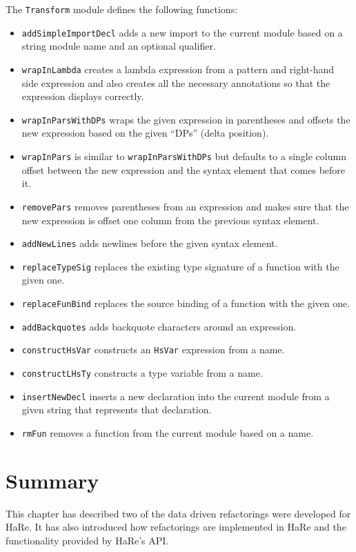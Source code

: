 The \texttt{Transform} module defines the following functions:

\begin{itemize}
\item \texttt{addSimpleImportDecl} adds a new import to the current module based on a string module name and an optional qualifier.
\item \texttt{wrapInLambda} creates a lambda expression from a pattern and right-hand side expression and also creates all the necessary annotations so that the expression displays correctly.
\item \texttt{wrapInParsWithDPs} wraps the given expression in parentheses and offsets the new expression based on the given ``DPs'' (delta position).
\item \texttt{wrapInPars} is similar to \texttt{wrapInParsWithDPs} but defaults to a single column offset between the new expression and the syntax element that comes before it.
\item  \texttt{removePars} removes parentheses from an expression and makes sure that the new expression is offset one column from the previous syntax element.
\item \texttt{addNewLines} adds newlines before the given syntax element.
\item \texttt{replaceTypeSig} replaces the existing type signature of a function with the given one.
\item \texttt{replaceFunBind} replaces the source binding of a function with the given one.
\item \texttt{addBackquotes} adds backquote characters around an expression.
\item \texttt{constructHsVar} constructs an \texttt{HsVar} expression from a name.
\item \texttt{constructLHsTy} constructs a type variable from a name.
\item \texttt{insertNewDecl} inserts a new declaration into the current module from a given string that represents that declaration.
\item \texttt{rmFun} removes a function from the current module based on a name.
\end{itemize}


\section{Summary}

This chapter has described two of the data driven refactorings were developed for HaRe. It has also introduced how refactorings are implemented in HaRe and the functionality provided by HaRe's API.

